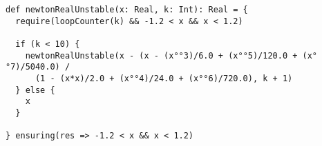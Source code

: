 \begin{lstlisting}
def newtonRealUnstable(x: Real, k: Int): Real = {
  require(loopCounter(k) && -1.2 < x && x < 1.2)

  if (k < 10) {
    newtonRealUnstable(x - (x - (x°°3)/6.0 + (x°°5)/120.0 + (x°°7)/5040.0) /
      (1 - (x*x)/2.0 + (x°°4)/24.0 + (x°°6)/720.0), k + 1)
  } else {
    x
  }

} ensuring(res => -1.2 < x && x < 1.2)
\end{lstlisting}